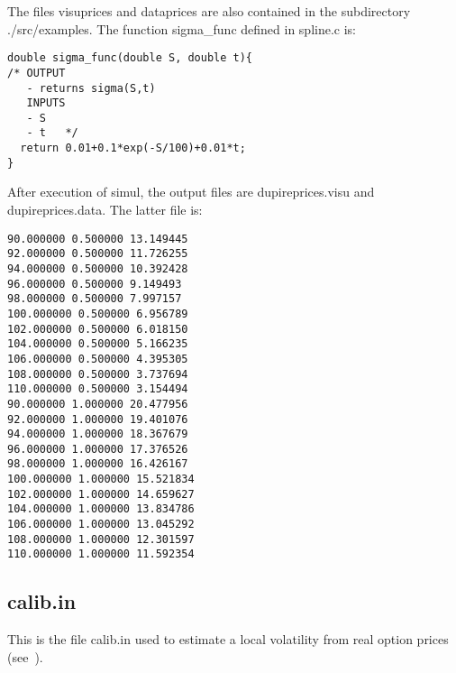 \documentclass[12pt]{article}
\begin{document}
The files visuprices and dataprices are also contained in the subdirectory 
./src/examples. The function sigma\_func defined in spline.c is:
\begin{verbatim}
double sigma_func(double S, double t){
/* OUTPUT
   - returns sigma(S,t)
   INPUTS
   - S
   - t   */
  return 0.01+0.1*exp(-S/100)+0.01*t;
}
\end{verbatim}
After execution of simul, the output files are dupireprices.visu and 
dupireprices.data. The latter file is:
\begin{verbatim}
90.000000 0.500000 13.149445
92.000000 0.500000 11.726255
94.000000 0.500000 10.392428
96.000000 0.500000 9.149493
98.000000 0.500000 7.997157
100.000000 0.500000 6.956789
102.000000 0.500000 6.018150
104.000000 0.500000 5.166235
106.000000 0.500000 4.395305
108.000000 0.500000 3.737694
110.000000 0.500000 3.154494
90.000000 1.000000 20.477956
92.000000 1.000000 19.401076
94.000000 1.000000 18.367679
96.000000 1.000000 17.376526
98.000000 1.000000 16.426167
100.000000 1.000000 15.521834
102.000000 1.000000 14.659627
104.000000 1.000000 13.834786
106.000000 1.000000 13.045292
108.000000 1.000000 12.301597
110.000000 1.000000 11.592354
\end{verbatim}

\subsection{calib.in}

This is the file calib.in used to estimate a local volatility from 
real option prices (see~\cite{bcv:inria:02}).
\end{document}
